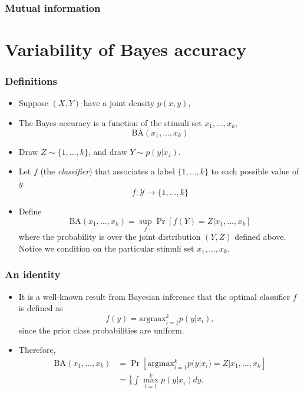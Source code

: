 \documentclass{beamer}
\begin{document}

\begin{frame}
\frametitle{Mutual information}
\end{frame}

\section{Variability of Bayes accuracy}

\begin{frame}
\sectionpage
\end{frame}

\begin{frame}
\frametitle{Definitions}
\begin{itemize}
\item Suppose $(X, Y)$ have a joint density $p(x, y)$,
\item The Bayes accuracy is a function of the stimuli set $x_1,...,x_k$,
\[
\text{BA}(x_1,...,x_k)
\]
\item Draw $Z \sim \{1,...,k\}$, and draw $Y \sim p(y|x_z)$.
\item Let $f$ (the \emph{classifier}) that associates a label $\{1,...,k\}$ to each possible value of $y$:
\[
f: \mathcal{Y} \to \{1,...,k\}
\]
\item Define
\[
\text{BA}(x_1,...,x_k) = \sup_f \Pr[f(Y) = Z| x_1,...,x_k]
\]
where the probability is over the joint distribution $(Y, Z)$ defined above.
Notice we condition on the particular stimuli set $x_1,...,x_k$.
\end{itemize}
\end{frame}


\begin{frame}
\frametitle{An identity}
\begin{itemize}
\item It is a well-known result from Bayesian inference that the optimal classifier $f$ is defined as
\[
f(y) = \text{argmax}_{i=1}^k p(y|x_i),
\]
since the prior class probabilities are uniform.
\item Therefore,
\begin{align*}
\text{BA}(x_1,...,x_k) &= \Pr[\text{argmax}_{i=1}^k p(y|x_i) = Z| x_1,...,x_k] 
\\&= \frac{1}{k}\int \max_{i=1}^k p(y|x_i) dy.
\end{align*}
\end{itemize}
\end{frame}
\end{document}
